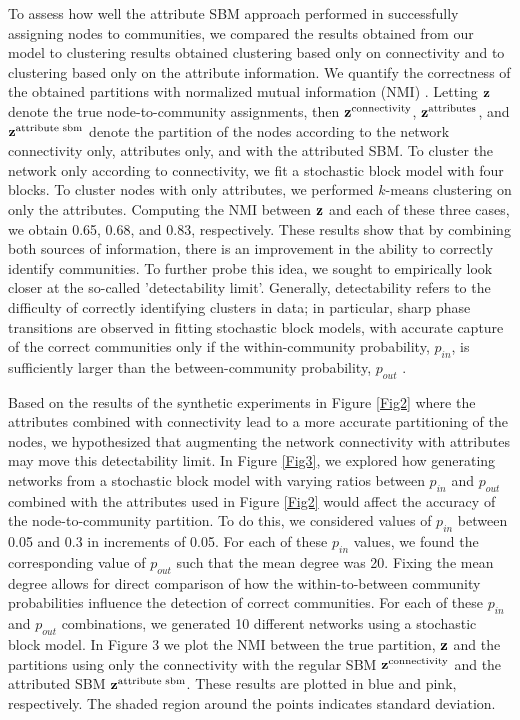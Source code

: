 To assess how well the attribute SBM approach performed in successfully assigning nodes to communities, we compared the results obtained from our model to clustering results obtained clustering based only on connectivity and to clustering based only on the attribute information. We quantify the correctness of the obtained partitions with normalized mutual information (NMI) \cite{commdeccompare}. Letting ${\bf z}$ denote the true node-to-community assignments, then ${\bf z}^{\text{connectivity}}$, ${\bf z}^{\text{attributes}}$, and ${\bf z}^{\text{attribute sbm}}$ denote the partition of the nodes according to the network connectivity only, attributes only, and with the attributed SBM. To cluster the network only according to connectivity, we fit a stochastic block model with four blocks. To cluster nodes with only attributes, we performed $k$-means clustering on only the attributes. Computing the NMI between ${\bf z}$ and each of these three cases, we obtain 0.65, 0.68, and 0.83, respectively. 
These results show that by combining both sources of information, there is an improvement in the ability to correctly identify communities. To further probe this idea, we sought to empirically look closer at the so-called 'detectability limit'. Generally, detectability refers to the difficulty of correctly identifying clusters in data; in particular, sharp phase transitions are observed in fitting stochastic block models, with accurate capture of the correct communities only if the within-community probability, $p_{in}$, is sufficiently larger than the between-community probability, $p_{out}$ \cite{decelle,taylor}. 

Based on the results of the synthetic experiments in Figure \ref{Fig2} where the attributes combined with connectivity lead to a more accurate partitioning of the nodes, we hypothesized that augmenting the network connectivity with attributes may move this detectability limit. In Figure \ref{Fig3}, we explored how generating networks from a stochastic block model with varying ratios between $p_{in}$ and $p_{out}$ combined with the attributes used in Figure \ref{Fig2} would affect the accuracy of the node-to-community partition. To do this, we considered values of $p_{in}$ between 0.05 and 0.3 in increments of 0.05. For each of these $p_{in}$ values, we found the corresponding value of $p_{out}$ such that the mean degree was 20. Fixing the mean degree allows for direct comparison of how the within-to-between community probabilities influence the detection of correct communities. For each of these $p_{in}$ and $p_{out}$ combinations, we generated 10 different networks using a stochastic block model. In Figure 3 we plot the NMI between the true partition, ${\bf z}$ and the partitions using only the connectivity with the regular SBM ${\bf z}^{\text{connectivity}}$ and the attributed SBM ${\bf z}^{\text{attribute sbm}}$. These results are plotted in blue and pink, respectively. The shaded region around the points indicates standard deviation. 

